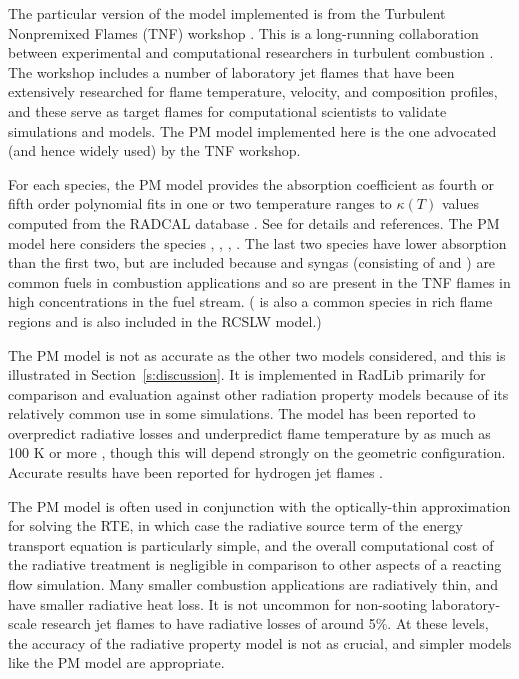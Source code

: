 \documentclass[preprint,12pt]{elsarticle}
\begin{document}
The particular version of the model implemented is from the Turbulent Nonpremixed Flames (TNF) workshop \cite{TNF}. This is a long-running collaboration between experimental and computational researchers in turbulent combustion \citep{Smith_2003,Barlow_2001}. The workshop includes a number of laboratory jet flames that have been extensively researched for flame temperature, velocity, and composition profiles, and these serve as target flames for computational scientists to validate simulations and models. The PM model implemented here is the one advocated (and hence widely used) by the TNF workshop. 

For each species, the PM model provides the absorption coefficient as fourth or fifth order polynomial fits in one or two temperature ranges to $\kappa(T)$ values computed from the RADCAL database \cite{Grosshandler_1993}. See \cite{TNF} for details and references. The PM model here considers the species , , , . The last two species have lower absorption than the first two, but are included because  and syngas (consisting of  and ) are common fuels in combustion applications and so are present in the TNF flames in high concentrations in the fuel stream. ( is also a common species in rich flame regions and is also included in the RCSLW model.) 

The PM model is not as accurate as the other two models considered, and this is illustrated in Section~\ref{s:discussion}. 
It is implemented in RadLib primarily for comparison and evaluation against other radiation property models because of its relatively common use in some simulations.
The model has been reported to overpredict radiative losses and underpredict flame temperature by as much as 100 K or more \cite{Frank_2000,Zhu_2002,Coelho_2002}, though this will depend strongly on the geometric configuration. Accurate results have been reported for hydrogen jet flames \cite{Barlow_1999}. 

The PM model is often used in conjunction with the optically-thin approximation for solving the RTE, in which case the radiative source term of the energy transport equation is particularly simple, and the overall computational cost of the radiative treatment is negligible in comparison to other aspects of a reacting flow simulation. Many smaller combustion applications are radiatively thin, and have smaller radiative heat loss. It is not uncommon for non-sooting laboratory-scale research jet flames to have radiative losses of around 5\%. At these levels, the accuracy of the radiative property model is not as crucial, and simpler models like the PM model are appropriate. 
\end{document}
